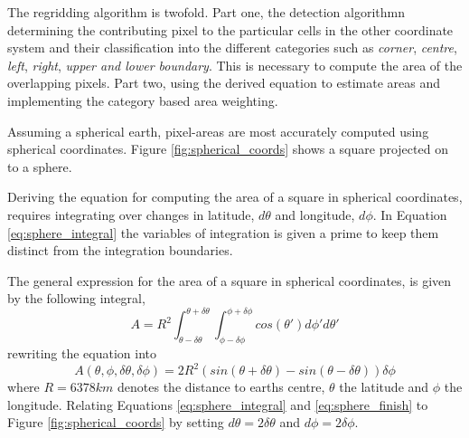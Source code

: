 
The regridding algorithm is twofold. Part one, the detection algorithmn determining the contributing pixel to the particular cells in the other coordinate system and their classification into the different categories such as \textit{corner}, \textit{centre}, \textit{left}, \textit{right}, \textit{upper and lower boundary}. This is necessary to compute the area of the overlapping pixels. Part two, using the derived equation to estimate areas and implementing the category based area weighting.


Assuming a spherical earth, pixel-areas are most accurately computed using spherical coordinates. Figure \ref{fig:spherical_coords} shows a square projected on to a sphere. 

Deriving the equation for computing the area of a square in spherical coordinates, requires integrating over changes in latitude, $d\theta$ and longitude, $d\phi$. In Equation \eqref{eq:sphere_integral} the variables of integration is given a prime to keep them distinct from the integration boundaries.

The general expression for the area of a square in spherical coordinates, is given by the following integral,
\begin{equation} \label{eq:sphere_integral}
    A = R^2\int_{ \theta - \delta \theta }^{\theta + \delta \theta} \int_{ \phi - \delta \phi }^{\phi + \delta \phi} cos\left( \theta' \right) d\phi' d\theta'
\end{equation}
rewriting the equation into
\begin{equation} \label{eq:sphere_finish}
    A \left( \theta, \phi, \delta \theta, \delta \phi   \right)= 2R^2 \left( sin\left( \theta + \delta \theta  \right) - sin\left(  \theta - \delta \theta  \right) \right) \delta \phi
\end{equation}
where $R=6378km$ denotes the distance to earths centre, $\theta$ the latitude and $\phi$ the longitude. Relating Equations \eqref{eq:sphere_integral} and \eqref{eq:sphere_finish} to Figure \ref{fig:spherical_coords} by setting $d \theta = 2 \delta \theta$ and $d \phi = 2 \delta \phi$.

